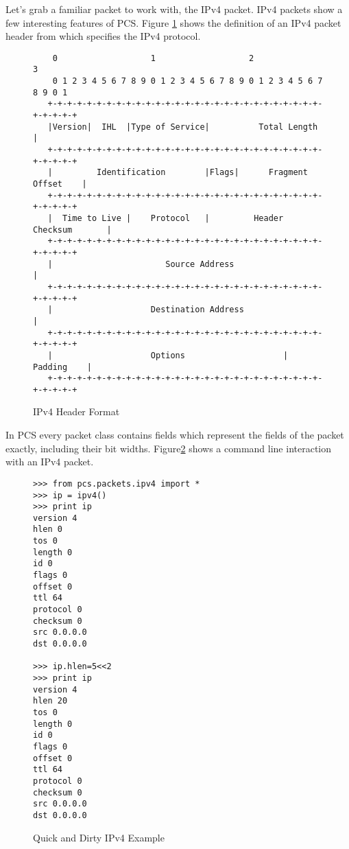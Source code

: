 \documentclass[11pt]{article}
\begin{document}
Let's grab a familiar packet to work with, the IPv4 packet.  IPv4
packets show a few interesting features of PCS.  Figure
\ref{fig:rfc791-ipheader} shows the definition of an IPv4 packet
header from \cite{rfc791} which specifies the IPv4 protocol.  

\begin{figure}
\label{fig:rfc791-ipheader}
  \centering
\begin{Verbatim}
    0                   1                   2                   3   
    0 1 2 3 4 5 6 7 8 9 0 1 2 3 4 5 6 7 8 9 0 1 2 3 4 5 6 7 8 9 0 1 
   +-+-+-+-+-+-+-+-+-+-+-+-+-+-+-+-+-+-+-+-+-+-+-+-+-+-+-+-+-+-+-+-+
   |Version|  IHL  |Type of Service|          Total Length         |
   +-+-+-+-+-+-+-+-+-+-+-+-+-+-+-+-+-+-+-+-+-+-+-+-+-+-+-+-+-+-+-+-+
   |         Identification        |Flags|      Fragment Offset    |
   +-+-+-+-+-+-+-+-+-+-+-+-+-+-+-+-+-+-+-+-+-+-+-+-+-+-+-+-+-+-+-+-+
   |  Time to Live |    Protocol   |         Header Checksum       |
   +-+-+-+-+-+-+-+-+-+-+-+-+-+-+-+-+-+-+-+-+-+-+-+-+-+-+-+-+-+-+-+-+
   |                       Source Address                          |
   +-+-+-+-+-+-+-+-+-+-+-+-+-+-+-+-+-+-+-+-+-+-+-+-+-+-+-+-+-+-+-+-+
   |                    Destination Address                        |
   +-+-+-+-+-+-+-+-+-+-+-+-+-+-+-+-+-+-+-+-+-+-+-+-+-+-+-+-+-+-+-+-+
   |                    Options                    |    Padding    |
   +-+-+-+-+-+-+-+-+-+-+-+-+-+-+-+-+-+-+-+-+-+-+-+-+-+-+-+-+-+-+-+-+
\end{Verbatim}
  \caption{IPv4 Header Format}
\end{figure}

In PCS every packet class contains fields which represent the fields
of the packet exactly, including their bit widths.
Figure\ref{fig:ipv4-quick-and-dirty} shows a command line interaction
with an IPv4 packet.

\begin{figure}
  \centering
\begin{lstlisting}
>>> from pcs.packets.ipv4 import *
>>> ip = ipv4()
>>> print ip
version 4
hlen 0
tos 0
length 0
id 0
flags 0
offset 0
ttl 64
protocol 0
checksum 0
src 0.0.0.0
dst 0.0.0.0

>>> ip.hlen=5<<2
>>> print ip
version 4
hlen 20
tos 0
length 0
id 0
flags 0
offset 0
ttl 64
protocol 0
checksum 0
src 0.0.0.0
dst 0.0.0.0
\end{lstlisting}
  \caption{Quick and Dirty IPv4 Example}
  \label{fig:ipv4-quick-and-dirty}
\end{figure}
\end{document}
